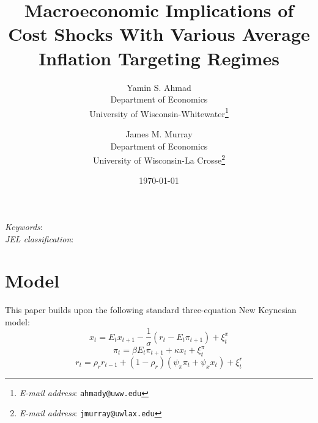 \documentclass[12pt]{article}
\begin{document}
\begin{titlepage}
\begin{singlespace}
\title{Macroeconomic Implications of Cost Shocks With Various Average Inflation Targeting Regimes}
\date{\today}
\author{
  Yamin S. Ahmad\\
  Department of Economics\\
  University of Wisconsin-Whitewater\footnote{\textit{E-mail address}: \texttt{ahmady@uww.edu}}
  \and
  James M. Murray\\
  Department of Economics\\
  University of Wisconsin-La Crosse\footnote{\textit{E-mail address}: \texttt{jmurray@uwlax.edu}}
}

\maketitle

\thispagestyle{empty}

\newline

\noindent \textit{Keywords}: \\
\noindent \textit{JEL classification}:
\end{singlespace}
\end{titlepage}

\newpage

\section{Model}

This paper builds upon the following standard three-equation New Keynesian model:
\begin{equation}\label{eq:IS}
  x_t = E_t x_{t+1} - \frac{1}{\sigma} \left( r_t - E_t \pi_{t+1} \right) + \xi_t^{x}
\end{equation}
\begin{equation}\label{eq:PhillipsCurve}
  \pi_t = \beta E_t \pi_{t+1} + \kappa x_t + \xi_t^{\pi}
\end{equation}
\begin{equation}\label{eq:TaylorRule}
  r_t = \rho_r r_{t-1} + (1-\rho_r) \left( \psi_\pi \pi_t + \psi_x x_t \right) + \xi_t^{r}
\end{equation}
\end{document}
